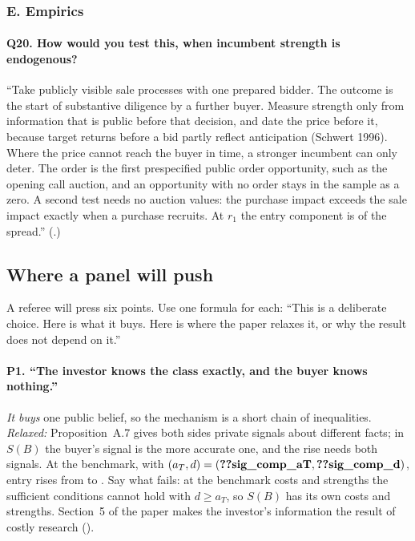 \subsubsection*{E. Empirics}

\paragraph{Q20. How would you test this, when incumbent strength is endogenous?}
``Take publicly visible sale processes with one prepared bidder. The outcome is the start of substantive diligence by a
further buyer. Measure strength only from information that is public before that decision, and date the price before
it, because target returns before a bid partly reflect anticipation (Schwert 1996). Where the price cannot reach the
buyer in time, a stronger incumbent can only deter. The order is the first prespecified public order opportunity,
such as the opening call auction, and an opportunity with no order stays in the sample as a zero. A second test
needs no auction values: the purchase impact exceeds the sale impact exactly when a purchase recruits. At \(r_1\)
the entry component is  of the spread.''
(.)

\subsection{Where a panel will push}\label{sec:13_panel-push}

A referee will press six points. Use one formula for each: ``This is a deliberate choice. Here is what it buys. Here
is where the paper relaxes it, or why the result does not depend on it.''

\paragraph{P1. ``The investor knows the class exactly, and the buyer knows nothing.''}
\emph{It buys} one public belief, so the mechanism is a short chain of inequalities. \emph{Relaxed:}
Proposition~A.7 gives both sides private signals about different facts; in \(S(B)\) the buyer's signal is the more
accurate one, and the rise needs both signals. At the benchmark, with \((a_T,d)=(\reg{sig_comp_aT},\reg{sig_comp_d})\), entry rises
from  to . Say what fails: at the benchmark costs and strengths the
sufficient conditions cannot hold with \(d\ge a_T\), so \(S(B)\) has its own costs and strengths. Section~5 of the
paper makes the investor's information the result of costly research
().

